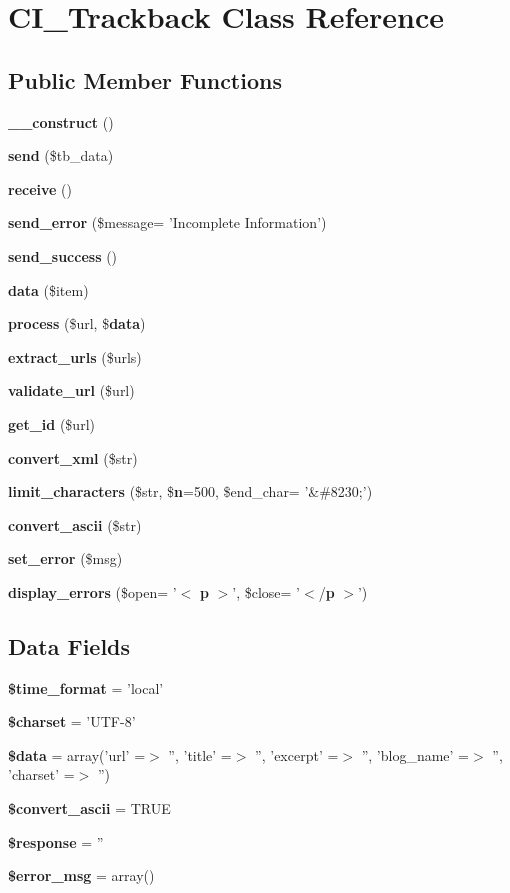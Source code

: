 \section{C\-I\-\_\-\-Trackback Class Reference}
\label{class_c_i___trackback}
\subsection*{Public Member Functions}
\begin{DoxyCompactItemize}
\item 
{\bf \-\_\-\-\_\-construct} ()
\item 
{\bf send} (\$tb\-\_\-data)
\item 
{\bf receive} ()
\item 
{\bf send\-\_\-error} (\$message= 'Incomplete Information')
\item 
{\bf send\-\_\-success} ()
\item 
{\bf data} (\$item)
\item 
{\bf process} (\$url, \${\bf data})
\item 
{\bf extract\-\_\-urls} (\$urls)
\item 
{\bf validate\-\_\-url} (\$url)
\item 
{\bf get\-\_\-id} (\$url)
\item 
{\bf convert\-\_\-xml} (\$str)
\item 
{\bf limit\-\_\-characters} (\$str, \${\bf n}=500, \$end\-\_\-char= '\&\#8230;')
\item 
{\bf convert\-\_\-ascii} (\$str)
\item 
{\bf set\-\_\-error} (\$msg)
\item 
{\bf display\-\_\-errors} (\$open= '$<$ {\bf p} $>$', \$close= '$<$/{\bf p} $>$')
\end{DoxyCompactItemize}
\subsection*{Data Fields}
\begin{DoxyCompactItemize}
\item 
{\bf \$time\-\_\-format} = 'local'
\item 
{\bf \$charset} = 'U\-T\-F-\/8'
\item 
{\bf \$data} = array('url' =$>$ '', 'title' =$>$ '', 'excerpt' =$>$ '', 'blog\-\_\-name' =$>$ '', 'charset' =$>$ '')
\item 
{\bf \$convert\-\_\-ascii} = T\-R\-U\-E
\item 
{\bf \$response} = ''
\item 
{\bf \$error\-\_\-msg} = array()
\end{DoxyCompactItemize}


